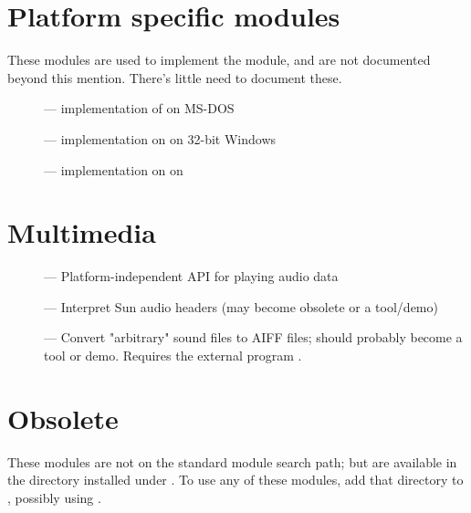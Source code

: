 \section{Platform specific modules}

These modules are used to implement the  module,
and are not documented beyond this mention.  There's little need to
document these.

\begin{description}
\item[]
--- implementation of  on MS-DOS

\item[]
--- implementation on  on 32-bit Windows

\item[]
--- implementation on  on \POSIX{}
\end{description}


\section{Multimedia}

\begin{description}
\item[]
--- Platform-independent API for playing audio data

\item[]
--- Interpret Sun audio headers (may become obsolete or a tool/demo)

\item[]
--- Convert "arbitrary" sound files to AIFF files; should probably
become a tool or demo.  Requires the external program .
\end{description}


\section{Obsolete}

These modules are not on the standard module search path;
but are available in the directory  installed  under
. %
To use any of these modules, add that directory to ,
possibly using .

